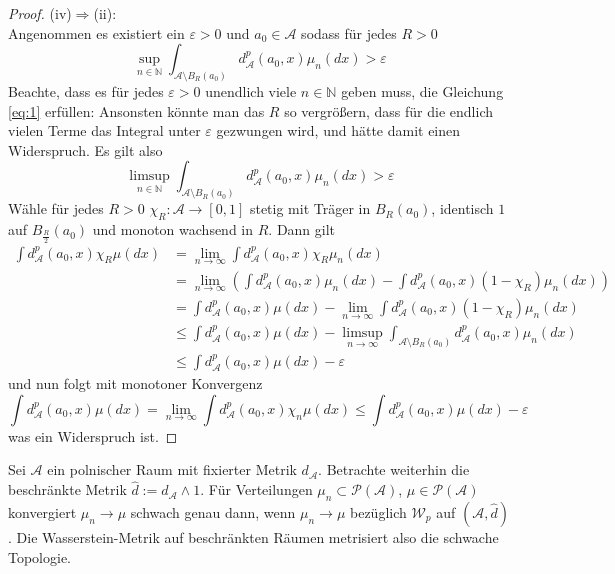 \begin{proof}
(iv)$\Rightarrow$(ii): \\
Angenommen es existiert ein $\varepsilon > 0$ und $a_0 \in \mathcal{A}$ sodass für jedes $R>0$ 
\begin{equation} \label{eq:1}
\sup\limits_{n\in\mathbb{N}}\int_{\mathcal{A}\setminus B_R(a_0)}d_\mathcal{A}^p(a_0, x)\mu_n(dx)>\varepsilon
\end{equation}
Beachte, dass es für jedes $\varepsilon>0$ unendlich viele $n \in \mathbb{N}$ geben muss, die Gleichung \ref{eq:1} erfüllen: Ansonsten könnte man das $R$ so vergrößern, dass für die endlich vielen Terme das Integral unter $\varepsilon$ gezwungen wird, und hätte damit einen Widerspruch. Es gilt also
$$\limsup\limits_{n\in\mathbb{N}}\int_{\mathcal{A}\setminus B_R(a_0)}d^p_\mathcal{A}(a_0, x)\mu_n(dx)>\varepsilon$$
Wähle für jedes $R>0$ $\chi_R: \mathcal{A}\rightarrow [0,1]$ stetig mit Träger in $B_R(a_0)$, identisch $1$ auf $B_{\frac{R}{2}}(a_0)$ und monoton wachsend in $R$. Dann gilt
\begin{align*}
    \int d^p_\mathcal{A}(a_0, x)\chi_R\mu(dx) &= \lim\limits_{n\rightarrow\infty}\int d^p_\mathcal{A}(a_0, x)\chi_R \mu_n(dx) \\
    &= \lim\limits_{n\rightarrow\infty}\left(\int d^p_\mathcal{A}(a_0, x)\mu_n(dx) - \int d^p_\mathcal{A}(a_0, x)(1-\chi_R)\mu_n(dx) \right) \\
    &= \int d^p_\mathcal{A}(a_0, x)\mu(dx) - \lim\limits_{n\rightarrow\infty}\int d^p_\mathcal{A}(a_0, x)(1-\chi_R)\mu_n(dx) \\
    &\leq \int d^p_\mathcal{A}(a_0, x)\mu(dx) - \limsup\limits_{n\rightarrow\infty} \int_{\mathcal{A}\setminus B_R(a_0)}d^p_\mathcal{A}(a_0, x)\mu_n(dx) \\
    &\leq \int d^p_\mathcal{A}(a_0, x)\mu(dx) - \varepsilon
\end{align*}
und nun folgt mit monotoner Konvergenz
$$\int d^p_\mathcal{A}(a_0, x)\mu(dx) = \lim\limits_{n\rightarrow\infty} \int d^p_\mathcal{A}(a_0, x)\chi_n\mu(dx) \leq \int d^p_\mathcal{A}(a_0, x)\mu(dx) - \varepsilon$$
was ein Widerspruch ist.
\end{proof}
\begin{lemma} \label{thm:weak_topology_metric}
Sei $\mathcal{A}$ ein polnischer Raum mit fixierter Metrik $d_\mathcal{A}$. Betrachte weiterhin die beschränkte Metrik $\hat{d}:=d_\mathcal{A} \wedge 1$. Für Verteilungen $\mu_n \subset \mathcal{P}(\mathcal{A})$, $\mu \in \mathcal{P}(\mathcal{A})$ konvergiert $\mu_n \rightarrow \mu$ schwach genau dann, wenn $\mu_n \rightarrow \mu$ bezüglich $\mathcal{W}_p$ auf $(\mathcal{A}, \hat{d})$. Die Wasserstein-Metrik auf beschränkten Räumen metrisiert also die schwache Topologie.
\end{lemma}

